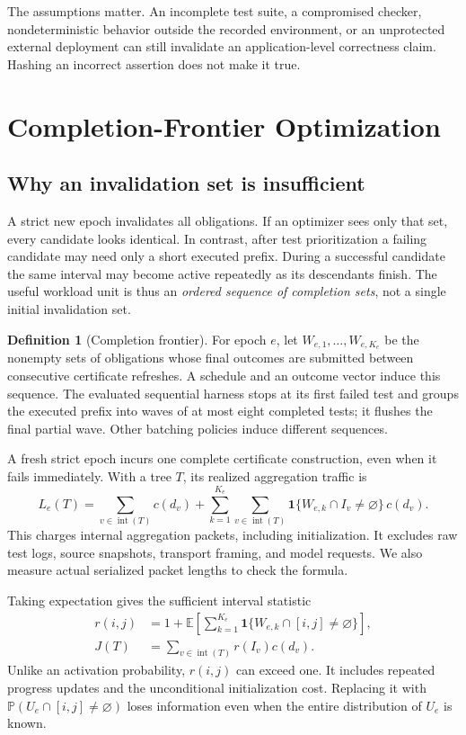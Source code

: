 \documentclass[11pt]{article}
\theoremstyle{definition}\newtheorem{definition}[theorem]{Definition}
\theoremstyle{remark}\newtheorem{remark}[theorem]{Remark}
\newcommand{\E}{\mathbb E}\newcommand{\Prb}{\mathbb P}\newcommand{\ind}{\mathbf 1}\newcommand{\R}{\mathcal R}
\begin{document}
The assumptions matter. An incomplete test suite, a compromised checker, nondeterministic behavior outside the recorded environment, or an unprotected external deployment can still invalidate an application-level correctness claim. Hashing an incorrect assertion does not make it true.

\section{Completion-Frontier Optimization}
\subsection{Why an invalidation set is insufficient}
A strict new epoch invalidates all obligations. If an optimizer sees only that set, every candidate looks identical. In contrast, after test prioritization a failing candidate may need only a short executed prefix. During a successful candidate the same interval may become active repeatedly as its descendants finish. The useful workload unit is thus an \emph{ordered sequence of completion sets}, not a single initial invalidation set.

\begin{definition}[Completion frontier]
For epoch $e$, let $W_{e,1},\ldots,W_{e,K_e}$ be the nonempty sets of obligations whose final outcomes are submitted between consecutive certificate refreshes. A schedule and an outcome vector induce this sequence. The evaluated sequential harness stops at its first failed test and groups the executed prefix into waves of at most eight completed tests; it flushes the final partial wave. Other batching policies induce different sequences.
\end{definition}

A fresh strict epoch incurs one complete certificate construction, even when it fails immediately. With a tree $T$, its realized aggregation traffic is
\begin{equation}\label{eq:realized}
 L_e(T)=\sum_{v\in\operatorname{int}(T)}c(d_v)
 +\sum_{k=1}^{K_e}\sum_{v\in\operatorname{int}(T)}
 \ind\{W_{e,k}\cap I_v\ne\varnothing\}\,c(d_v).
\end{equation}
This charges internal aggregation packets, including initialization. It excludes raw test logs, source snapshots, transport framing, and model requests. We also measure actual serialized packet lengths to check the formula.

Taking expectation gives the sufficient interval statistic
\begin{align}
 r(i,j)&=1+\E\left[\sum_{k=1}^{K_e}\ind\{W_{e,k}\cap[i,j]\ne\varnothing\}\right],\label{eq:weights}\\
 J(T)&=\sum_{v\in\operatorname{int}(T)}r(I_v)c(d_v).\label{eq:objective}
\end{align}
Unlike an activation probability, $r(i,j)$ can exceed one. It includes repeated progress updates and the unconditional initialization cost. Replacing it with $\Prb(U_e\cap[i,j]\ne\varnothing)$ loses information even when the entire distribution of $U_e$ is known.
\end{document}
